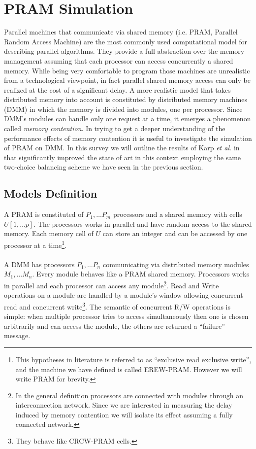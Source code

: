 \section{PRAM Simulation}

Parallel machines that communicate via shared memory
(i.e. PRAM, Parallel Random Access Machine) are the most
commonly used computational model for describing parallel algorithms.
They provide a full abstraction over the memory management assuming
that each processor can access concurrently a shared memory. While being
very comfortable to program those machines are unrealistic from a technological
viewpoint, in fact parallel shared memory access can only be realized at the
cost of a significant delay. A more realistic model that takes distributed
memory into account is constituted by distributed memory machines (DMM) in which
the memory is divided into modules, one per processor. Since DMM's modules can
handle only one request at a time, it emerges a phenomenon
called \textit{memory contention}.
In trying to get a deeper understanding of the performance
effects of memory contention it is useful to investigate the simulation of
 PRAM on DMM. In this survey we will outline the results of Karp {\em et al.} in
 \cite{Karp} that significantly improved the state of art in this context
 employing the same two-choice balancing scheme we have seen in the
 previous section.

\subsection{Models Definition}
  A PRAM is constituted of $P_1, \dots P_m$ processors
  and a shared memory with cells $U[1, \dots p]$. The processors
  works in parallel and have random access to the shared memory.
  Each memory cell of $U$ can store an integer and can be accessed
  by one processor at a time\footnote{This hypotheses in literature is referred
    to as ``exclusive read exclusive write'', and the machine we have defined
    is called EREW-PRAM. However we will write PRAM for brevity.}. \\
 \\
  A DMM has processors $P_1, \dots P_n$ communicating via distributed
  memory modules $M_1, \dots M_n$. Every module behaves like a PRAM
  shared memory. Processors works in parallel and each
  processor can access any module\footnote{In the general definition processors
    are connected with modules through an interconnection network. Since we are
    interested in measuring the delay induced by memory contention we will
    isolate its effect assuming a fully connected network.}.
  Read and Write operations on a module are handled by a module's window
  allowing concurrent read and concurrent write\footnote{They
    behave like CRCW-PRAM cells.}. The semantic of concurrent R/W operations
  is simple:
  when multiple processor tries to access simultaneously then one is chosen
  arbitrarily and can access the module, the others are returned a
  ``failure'' message. 

